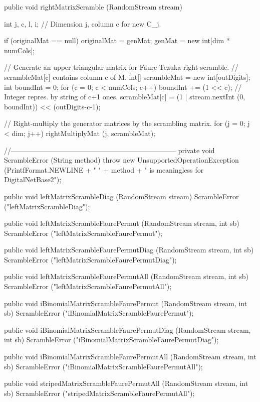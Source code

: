 \begin{code}
\begin{hide}
   public void rightMatrixScramble (RandomStream stream) {
      int j, c, l, i;     // Dimension j, column c for new C_j.

      if (originalMat == null) {
         originalMat = genMat;
         genMat = new int[dim * numCols];
      }

      // Generate an upper triangular matrix for Faure-Tezuka right-scramble.
      // scrambleMat[c] contains column c of M.
      int[] scrambleMat = new int[outDigits];
      int boundInt = 0;
      for (c = 0; c < numCols; c++) {
         boundInt += (1 << c); // Integer repres. by string of c+1 ones.
         scrambleMat[c] = (1 | stream.nextInt (0, boundInt))
                          << (outDigits-c-1);
      }

      // Right-multiply the generator matrices by the scrambling matrix.
      for (j = 0; j < dim; j++)
         rightMultiplyMat (j, scrambleMat);
   }

   //-----------------------------------------------------------------------
   private void ScrambleError (String method) {
       throw new UnsupportedOperationException
       (PrintfFormat.NEWLINE + "  " + method +
           " is meaningless for DigitalNetBase2");
   }

   public void leftMatrixScrambleDiag (RandomStream stream)  {
       ScrambleError ("leftMatrixScrambleDiag");
   }

   public void leftMatrixScrambleFaurePermut (RandomStream stream, int sb) {
       ScrambleError ("leftMatrixScrambleFaurePermut");
   }

   public void leftMatrixScrambleFaurePermutDiag (RandomStream stream,
       int sb) {
       ScrambleError ("leftMatrixScrambleFaurePermutDiag");
   }

   public void leftMatrixScrambleFaurePermutAll (RandomStream stream,
       int sb) {
       ScrambleError ("leftMatrixScrambleFaurePermutAll");
   }

   public void iBinomialMatrixScrambleFaurePermut (RandomStream stream,
       int sb) {
       ScrambleError ("iBinomialMatrixScrambleFaurePermut");
   }

   public void iBinomialMatrixScrambleFaurePermutDiag (RandomStream stream,
       int sb) {
       ScrambleError ("iBinomialMatrixScrambleFaurePermutDiag");
   }

   public void iBinomialMatrixScrambleFaurePermutAll (RandomStream stream,
       int sb) {
       ScrambleError ("iBinomialMatrixScrambleFaurePermutAll");
   }

   public void stripedMatrixScrambleFaurePermutAll (RandomStream stream,
       int sb) {
       ScrambleError ("stripedMatrixScrambleFaurePermutAll");
   }\end{hide}
\end{code}



